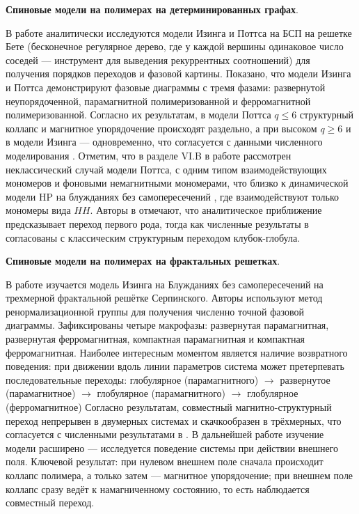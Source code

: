   
    \textbf{Спиновые модели на полимерах на детерминированных графах}.
  
  В работе \cite{PhysRevE.106.024130} аналитически исследуются модели Изинга и Поттса на БСП на решетке Бете (бесконечное регулярное дерево, где у каждой вершины одинаковое число соседей --- инструмент для выведения рекуррентных соотношений) для получения порядков переходов и фазовой картины.  
  Показано, что модели Изинга  и Поттса  демонстрируют  фазовые диаграммы с тремя фазами: развернутой неупорядоченной, парамагнитной полимеризованной  и ферромагнитной полимеризованной. Согласно их результатам,  в модели Поттса $q \le 6$ структурный коллапс и магнитное упорядочение происходят раздельно, а при высоком $q \ge 6 $ и в модели Изинга --- одновременно, что согласуется с данными численного моделирования \cite{Garel_1999,PhysRevE.104.024122,faizullina2021critical1}. 
  Отметим, что в  разделе VI.B в работе \cite{PhysRevE.106.024130} рассмотрен неклассический случай модели Поттса,  с одним типом взаимодействующих  мономеров и фоновыми немагнитными мономерами, что близко к динамической модели  HP на блужданиях без самопересечений  \cite{faizullina2021globule1}, где взаимодействуют только мономеры вида $HH$.  Авторы в \cite{PhysRevE.106.024130} отмечают, что аналитическое приближение предсказывает переход первого рода, тогда как численные результаты в  \cite{faizullina2021globule1} согласованы с классическим структурным переходом клубок-глобула. 
  
  
      \textbf{Спиновые модели на полимерах на фрактальных решетках}.
  
  В работе \cite{PhysRevE.108.L042502} изучается  модель Изинга на Блужданиях без самопересечений на трехмерной фрактальной решётке Серпинского. 
  Авторы используют метод ренормализационной группы для получения численно точной фазовой диаграммы.
  Зафиксированы четыре макрофазы: развернутая парамагнитная, развернутая ферромагнитная, компактная парамагнитная и компактная ферромагнитная. Наиболее интересным моментом является наличие возвратного поведения: при движении вдоль линии параметров система может претерпевать последовательные переходы:  глобулярное (парамагнитного) $\rightarrow$  развернутое (парамагнитное) $\rightarrow$ глобулярное (парамагнитного)  $\rightarrow$ глобулярное (ферромагнитное) 
  Согласно результатам, совместный магнитно-структурный переход непрерывен в двумерных системах и скачкообразен в трёхмерных, что согласуется с численными результатами в \cite{Garel_1999,PhysRevE.104.024122,faizullina2021critical1}. 
  В дальнейшей работе \cite{13zf-ybf8} изучение модели расширено --- исследуется поведение системы при действии внешнего поля.  
  Ключевой результат: при нулевом внешнем поле сначала происходит коллапс полимера, а только затем --- магнитное упорядочение; при внешнем поле коллапс сразу ведёт к намагниченному состоянию, то есть наблюдается совместный переход.
  
